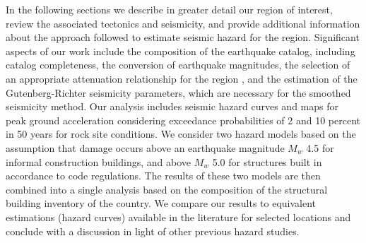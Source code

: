 In the following sections we describe in greater detail our region of interest, review the associated tectonics and seismicity, and provide additional information about the approach followed to estimate seismic hazard for the region. Significant aspects of our work include the composition of the earthquake catalog, including catalog completeness, the conversion of earthquake magnitudes, the selection of an appropriate attenuation relationship for the region \citep{Zafarani2014, Kalkan2004}, and the estimation of the Gutenberg-Richter seismicity parameters, which are necessary for the smoothed seismicity method. Our analysis includes seismic hazard curves and maps for peak ground acceleration considering exceedance probabilities of 2 and 10 percent in 50 years for rock site conditions. We consider two hazard models based on the assumption that damage occurs above an earthquake magnitude $M_w$ 4.5 for informal construction buildings, and above $M_w$ 5.0 for structures built in accordance to code regulations. The results of these two models are then combined into a single analysis based on the composition of the structural building inventory of the country. We compare our results to equivalent estimations (hazard curves) available in the literature for selected locations and conclude with a discussion in light of other previous hazard studies.







